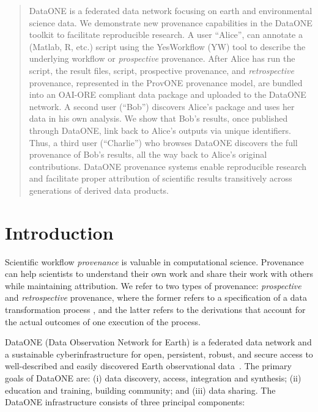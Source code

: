 \documentclass[a4paper]{llncs}
\begin{document}
\begin{abstract}
  DataONE is a federated data network focusing on earth and environmental science data.  We demonstrate new provenance capabilities in the DataONE toolkit to facilitate reproducible research. A user ``Alice'', can annotate a (Matlab, R, etc.) script using the YesWorkflow (YW) tool to describe the underlying workflow or \emph{prospective} provenance. After Alice has run the script, the result files, script, prospective provenance, and \emph{retrospective} provenance, represented in the ProvONE provenance model, are bundled into an OAI-ORE compliant data package and uploaded to the DataONE network. A second user (``Bob'') discovers Alice's package and uses her data in his own analysis. We show that Bob's results, once published through DataONE, link back to Alice's outputs via unique identifiers. Thus, a third user (``Charlie'') who browses DataONE discovers the full provenance of Bob's results, all the way back to Alice's original contributions.  DataONE provenance systems enable reproducible research and facilitate proper attribution of scientific results transitively across generations of derived data products.  \end{abstract}




\section{Introduction}

Scientific workflow \emph{provenance} is valuable in computational science. Provenance can help scientists to understand their own work and share their work with others while maintaining attribution. We refer to two types of provenance: \emph{prospective} and \emph{retrospective} provenance, where the former refers to a specification of a data transformation process \cite{Freire2008}, and the latter refers to the derivations that account for the actual outcomes of one execution of the process.

DataONE (Data Observation Network for Earth) is a federated data network and a sustainable cyberinfrastructure for open, persistent, robust, and secure access to well-described and easily discovered Earth observational data~\cite{dataone}. The primary goals of DataONE are: (i) data discovery, access, integration and synthesis;  (ii) education and training, building community; and (iii) data sharing. The DataONE infrastructure consists of three principal components:
\end{document}
